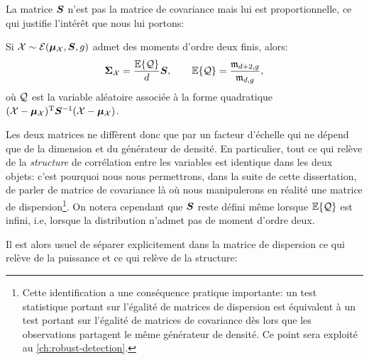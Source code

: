 La matrice $\boldsymbol{S}$ n'est pas la matrice de covariance mais lui est proportionnelle, ce qui justifie l'intérêt que nous lui portons:


\begin{property}
\label{prop:context-distributions-scattercov}
  Si $\mathcal{X}\sim\mathcal{E}(\boldsymbol{\mu}_{\mathcal{X}},\boldsymbol{S},g)$ admet des moments d'ordre deux finis, alors:
  \begin{equation}
    \boldsymbol{\Sigma}_{\mathcal{X}}
    =
    \frac{\operatorname{\mathbb{E}}\{\mathcal{Q}\}}{d}\boldsymbol{S},
    \qquad
    \operatorname{\mathbb{E}}\{\mathcal{Q}\} = \frac{\mathfrak{m}_{d+2,g}}{\mathfrak{m}_{d,g}},
    \label{eq:context-distributions-scattercov}
  \end{equation}
  où $\mathcal{Q}$ est la variable aléatoire associée à la forme quadratique $(\mathcal{X}-\boldsymbol{\mu}_{\mathcal{X}})^{\mathrm{T}} {\boldsymbol{S}}^{-1} (\mathcal{X}-\boldsymbol{\mu}_{\mathcal{X}})$.
\end{property}

\begin{remark}
  Les deux matrices ne diffèrent donc que par un facteur d'échelle qui ne dépend que de la dimension et du générateur de densité. En particulier, tout ce qui relève de la \emph{structure} de corrélation entre les variables est identique dans les deux objets: c'est pourquoi nous nous permettrons, dans la suite de cette dissertation, de parler de matrice de covariance là où nous manipulerons en réalité une matrice de dispersion\footnote{Cette identification a une conséquence pratique importante: un test statistique portant sur l'égalité de matrices de dispersion est équivalent à un test portant sur l'égalité de matrices de covariance dès lors que les observations partagent le même générateur de densité. Ce point sera exploité au \cref{ch:robust-detection}.}. On notera cependant que $\boldsymbol{S}$ reste défini même lorsque $\operatorname{\mathbb{E}}\{\mathcal{Q}\}$ est infini, i.e, lorsque la distribution n'admet pas de moment d'ordre deux.
\end{remark}

Il est alors usuel de séparer explicitement dans la matrice de dispersion ce qui relève de la puissance et ce qui relève de la structure:

